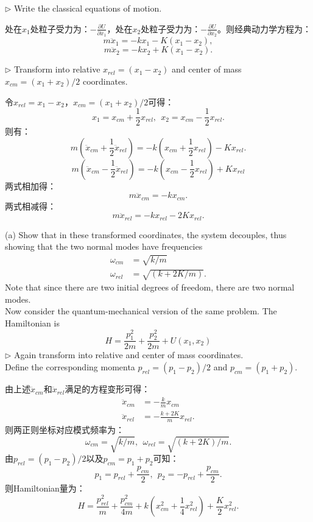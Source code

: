 \documentclass[reqno,a4paper,12pt]{amsart}
\begin{document}
$\triangleright$ Write the classical equations of motion. 
\begin{tcolorbox}[breakable, colback = black!5!white, colframe = black]
处在$x_1$处粒子受力为：$-\frac{\partial U}{\partial x_1}$，处在$x_2$处粒子受力为：$-\frac{\partial U}{\partial x_2}$。则经典动力学方程为：
\[
	m\ddot{x}_1 = -k x_1 - K(x_1-x_2),
\]
\[
	m\ddot{x}_2 = -k x_2 + K(x_1-x_2).
\]
\end{tcolorbox}
$\triangleright$ Transform into relative $x_{rel} = (x_1-x_2)$ and center of mass $x_{cm} = (x_1+x_2)/2$ coordinates.
\begin{tcolorbox}[breakable, colback = black!5!white, colframe = black]
令$x_{rel} = x_1 - x_2$，$x_{cm} = (x_1+x_2)/2$可得：
\[
	x_1 = x_{cm} + \frac{1}{2}x_{rel}, ~~ x_2 = x_{cm} - \frac{1}{2}x_{rel}.
\]
则有：
\[
	m\left( \ddot{x}_{cm} + \frac{1}{2}\ddot{x}_{rel} \right) = -k\left( x_{cm} + \frac{1}{2}x_{rel} \right) - Kx_{rel}.
\]
\[
	m\left( \ddot{x}_{cm} - \frac{1}{2}\ddot{x}_{rel} \right) = -k\left( x_{cm} - \frac{1}{2}x_{rel} \right) + Kx_{rel}
\]
两式相加得：
\[
	m\ddot{x}_{cm} = -kx_{cm}.
\]
两式相减得：
\[
	m\ddot{x}_{rel} = -k x_{rel} - 2K x_{rel}.
\]
\end{tcolorbox}
(a) Show that in these transformed coordinates, the system decouples, thus showing that the two normal modes have frequencies 
\begin{align*}
	\omega_{cm} &= \sqrt{k/m} \\
	\omega_{rel} &= \sqrt{(k+2K/m)}.
\end{align*}
Note that since there are two initial degrees of freedom, there are two normal modes. \\
Now consider the quantum-mechanical version of the same problem. The Hamiltonian is 
\[
	H = \frac{p_1^2}{2m} + \frac{p_2^2}{2m} + U(x_1,x_2)
\]
$\triangleright$ Again transform into relative and center of mass coordinates. \\
Define the corresponding momenta $p_{rel} = (p_1-p_2)/2$ and $p_{cm} = (p_1+p_2)$.
\begin{tcolorbox}[breakable, colback = black!5!white, colframe = black]
由上述$\ddot{x}_{cm}$和$\ddot{x}_{rel}$满足的方程变形可得：
\begin{align*}
	\ddot{x}_{cm} &= -\frac{k}{m}x_{cm} \\
	\ddot{x}_{rel} &= -\frac{k+2K}{m}x_{rel}.
\end{align*}
则两正则坐标对应模式频率为：
\[
	\omega_{cm} = \sqrt{k/m}, ~~ \omega_{rel} = \sqrt{(k+2K)/m}.
\]
由$p_{rel} = (p_1-p_2)/2$以及$p_{cm} = p_1+p_2$可知：
\[
	p_1 = p_{rel} +\frac{p_{cm}}{2}, ~~ p_2 = -p_{rel} + \frac{p_{cm}}{2}.
\]
则Hamiltonian量为：
\[
	H = \frac{p_{rel}^2}{m} + \frac{p_{cm}^2}{4m} + k\left(x_{cm}^2 + \frac{1}{4}x_{rel}^2 \right) + \frac{K}{2}x_{rel}^2.
\]
\end{tcolorbox}
\end{document}
